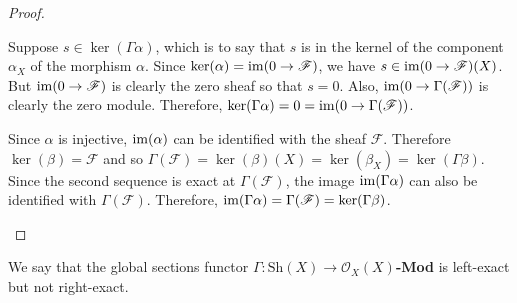 \begin{proof}\hfill
  \begin{description}[style=nextline]
    \item[Exactness at $\Gamma(\mathscr{F})$]
          Suppose $s\in\ker(\Gamma\alpha)$, which is to say that $s$ is in
          the kernel of the component $\alpha_{X}$ of the morphism $\alpha$.
          Since $\ker(\alpha)=\operatorname{im}(0\to\mathscr{F})$, we have
          $s\in\operatorname{im}({0\to\mathscr{F}})(X)$. But $\operatorname{im}(0\to\mathscr{F})$ is
          clearly the zero sheaf so that $s=0$. Also,
          $\operatorname{im}(0\to\Gamma(\mathscr{F}))$ is clearly the zero module.
          Therefore, $\ker(\Gamma\alpha)=0=\operatorname{im}({0\to\Gamma(\mathscr{F})})$.
    \item[Exactness at $\Gamma(\mathscr{G})$]
          Since $\alpha$ is injective, $\operatorname{im}(\alpha)$ can be identified with
          the sheaf $\mathscr{F}$. Therefore $\ker(\beta)=\mathscr{F}$ and so
          $\Gamma\left(\mathscr{F}\right)=\ker(\beta)(X)=\ker(\beta_{X})
          =\ker(\Gamma\beta)$. Since the second sequence is exact at
          $\Gamma\left(\mathscr{F}\right)$, the image $\operatorname{im}(\Gamma\alpha)$
          can also be identified with $\Gamma\left(\mathscr{F}\right)$.
          Therefore, $\operatorname{im}(\Gamma\alpha)=\Gamma(\mathscr{F})
          =\ker(\Gamma\beta)$.\qedhere
  \end{description}
\end{proof}
\begin{cat}
  We say that the global sections functor $\Gamma: \text{Sh}(X)\to
  \mathscr{O}_{X}(X)$\textbf{-Mod} is left-exact but not right-exact.
\end{cat}


